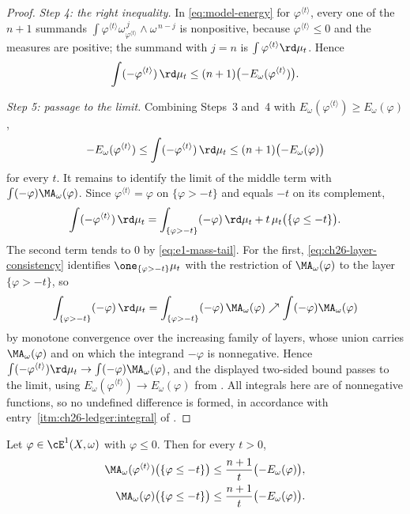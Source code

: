 \begin{proof}
\emph{Step 4: the right inequality.}  In \eqref{eq:model-energy} for
\(\varphi^{\langle t\rangle}\), every one of the \(n+1\) summands
\(\int\varphi^{\langle t\rangle}
\omega_{\varphi^{\langle t\rangle}}^{\,j}\wedge\omega^{\,n-j}\)
is nonpositive, because \(\varphi^{\langle t\rangle}\leq0\) and the measures
are positive; the summand with \(j=n\) is
\(\int\varphi^{\langle t\rangle}\rd\mu_t\).  Hence
\[
 \int(-\varphi^{\langle t\rangle})\,\rd\mu_t
 \leq(n+1)\bigl(-E_\omega(\varphi^{\langle t\rangle})\bigr).
\]

\emph{Step 5: passage to the limit.}  Combining Steps~3 and~4 with
\(E_\omega(\varphi^{\langle t\rangle})\geq E_\omega(\varphi)\),
\[
 -E_\omega(\varphi^{\langle t\rangle})
 \leq\int(-\varphi^{\langle t\rangle})\,\rd\mu_t
 \leq(n+1)\bigl(-E_\omega(\varphi)\bigr)
\]
for every \(t\).  It remains to identify the limit of the middle term with
\(\int(-\varphi)\MA_\omega(\varphi)\).  Since
\(\varphi^{\langle t\rangle}=\varphi\) on \(\{\varphi>-t\}\) and equals
\(-t\) on its complement,
\begin{equation}
\label{eq:ch26-tail-split}
 \int(-\varphi^{\langle t\rangle})\,\rd\mu_t
 =\int_{\{\varphi>-t\}}(-\varphi)\,\rd\mu_t
  +t\,\mu_t\bigl(\{\varphi\leq-t\}\bigr).
\end{equation}
The second term tends to \(0\) by \eqref{eq:e1-mass-tail}.  For the first,
\eqref{eq:ch26-layer-consistency} identifies \(\one_{\{\varphi>-t\}}\mu_t\)
with the restriction of \(\MA_\omega(\varphi)\) to the layer
\(\{\varphi>-t\}\), so
\[
 \int_{\{\varphi>-t\}}(-\varphi)\,\rd\mu_t
 =\int_{\{\varphi>-t\}}(-\varphi)\,\MA_\omega(\varphi)
 \nearrow\int(-\varphi)\MA_\omega(\varphi)
\]
by monotone convergence over the increasing family of layers, whose union
carries \(\MA_\omega(\varphi)\) and on which the integrand \(-\varphi\) is
nonnegative.  Hence
\(\int(-\varphi^{\langle t\rangle})\rd\mu_t\to
\int(-\varphi)\MA_\omega(\varphi)\), and the displayed two-sided bound passes
to the limit, using \(E_\omega(\varphi^{\langle t\rangle})\to
E_\omega(\varphi)\) from .  All integrals
here are of nonnegative functions, so no undefined difference is formed, in
accordance with entry~\cref{itm:ch26-ledger:integral} of
.
\end{proof}

\begin{corollary}
\label{cor:ch26-quantitative-tail}
Let \(\varphi\in\cE^1(X,\omega)\) with \(\varphi\leq0\).  Then for every
\(t>0\),
\begin{equation}
\label{eq:ch26-quantitative-tail}
 \begin{aligned}
 \MA_\omega(\varphi^{\langle t\rangle})
   \bigl(\{\varphi\leq-t\}\bigr)
 &\leq\frac{n+1}{t}\bigl(-E_\omega(\varphi)\bigr),\\
 \MA_\omega(\varphi)\bigl(\{\varphi\leq-t\}\bigr)
 &\leq\frac{n+1}{t}\bigl(-E_\omega(\varphi)\bigr).
 \end{aligned}
\end{equation}
\end{corollary}

